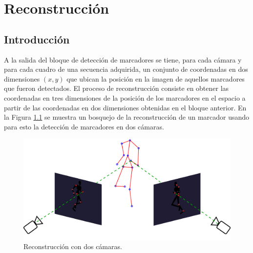 \chapter{Reconstrucción}\label{reconstruccion}

\section{Introducción}
A la salida del bloque de detección de marcadores se tiene, para cada cámara y para cada cuadro de una secuencia adquirida, un conjunto de coordenadas en dos dimensiones $(x,y)$ que ubican la posición en la imagen de aquellos marcadores que fueron detectados.
El proceso de reconstrucción consiste en obtener las coordenadas en tres dimensiones de la posición de los marcadores en el espacio a partir de las coordenadas en dos dimensiones obtenidas en el bloque anterior.
En la Figura \ref{fig: esquema_reconstruccion} se muestra un bosquejo de la reconstrucción de un marcador usando para esto la detección de marcadores en dos cámaras.\\

\begin{figure}[ht!]
\begin{center}
\includegraphics[scale=0.20]{img/Reconstruccion/reconstruccion}
\end{center}
\caption{Reconstrucción con dos cámaras.}
\label{fig: esquema_reconstruccion}
\end{figure}

